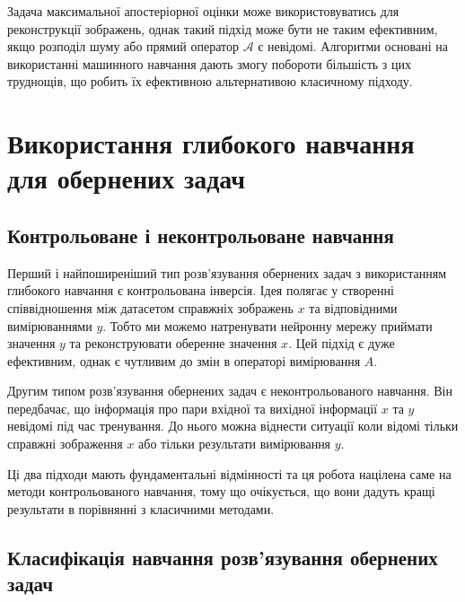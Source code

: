 \documentclass[14pt,a4paper]{extarticle}
\newcounter{e}
\numberwithin{equation}{section}
\numberwithin{figure}{section}
\begin{document}
	Задача максимальної апостеріорної оцінки може використовуватись для реконструкції зображень, однак такий підхід може бути не таким ефективним, якщо розподіл шуму або прямий оператор $\mathcal{A}$ є невідомі.  
	Алгоритми основані на використанні машинного навчання дають змогу побороти більшість з цих труднощів, що робить їх ефективною альтернативою класичному підходу.


	\newpage
	\thispagestyle{empty}
	\section{Використання глибокого навчання для обернених задач}

	\subsection{Контрольоване і неконтрольоване навчання}
	Перший і найпоширеніший тип розв'язування обернених задач з використанням глибокого навчання є контрольована інверсія. Ідея полягає у створенні співвідношення між датасетом справжніх зображень $x$ та відповідними вимірюваннями $y$. Тобто ми можемо натренувати нейронну мережу приймати значення $y$ та реконструювати оберенне значення $x$. Цей підхід є дуже ефективним, однак є чутливим до змін в операторі вимірювання $A$. 
	
	Другим типом розв'язування обернених задач є неконтрольованого навчання. Він передбачає, що інформація про пари вхідної та вихідної інформації $x$ та $y$ невідомі під час тренування. До нього можна віднести ситуації коли відомі тільки справжні зображення $x$ або тільки результати вимірювання $y$.
	
	Ці два підходи мають фундаментальні відмінності та ця робота націлена саме на методи контрольованого навчання, тому що очікується, що вони дадуть кращі результати в порівнянні з класичними методами. 
	
	\subsection{Класифікація навчання розв'язування обернених задач}
	
\end{document}
